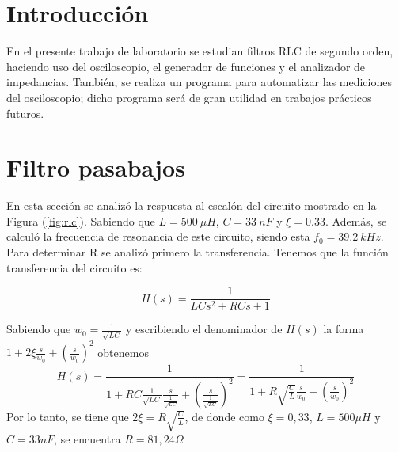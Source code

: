 

\usepackage{subfigure}







\tableofcontents
\newpage


\section{Introducción}
En el presente trabajo de laboratorio se estudian filtros RLC de segundo orden, haciendo uso del osciloscopio, el generador de funciones y el analizador de impedancias. También, se realiza un programa para automatizar las mediciones del osciloscopio; dicho programa será de gran utilidad en trabajos prácticos futuros.



\section{Filtro pasabajos}

En esta sección se analizó la respuesta al escalón del circuito mostrado en la Figura (\ref{fig:rlc}). Sabiendo que $L = 500 \ \mu H$, $C = 33 \ nF$ y $\xi = 0.33$. Además, se calculó la frecuencia de resonancia de este circuito, siendo esta $f_0 = 39.2 \ kHz$. Para determinar R se analizó primero la transferencia. Tenemos que la función transferencia del circuito es:

\begin{equation}
	H(s) = \frac{1}{LC s^2 + RC s + 1}
	\label{equ:hrlc}
\end{equation}

Sabiendo que $w_0=\frac{1}{\sqrt{LC}}$ y escribiendo el denominador de $H(s)$ la forma $1+2\xi\frac{s}{w_0}+(\frac{s}{w_0})^2$ obtenemos \begin{equation}
    H(s)=\frac{1}{1+RC\frac{1}{\sqrt{LC}}\frac{s}{\frac{1}{\sqrt{LC}}}+(\frac{s}{\frac{1}{\sqrt{LC}}})^2}=\frac{1}{1+R\sqrt{\frac{C}{L}}\frac{s}{w_0}+(\frac{s}{w_0})^2}
\end{equation}
Por lo tanto, se tiene que $2\xi=R\sqrt{\frac{C}{L}}$, de donde como $\xi=0,33$, $L=500\mu H$ y $C=33nF$, se encuentra $R=81,24\Omega$


